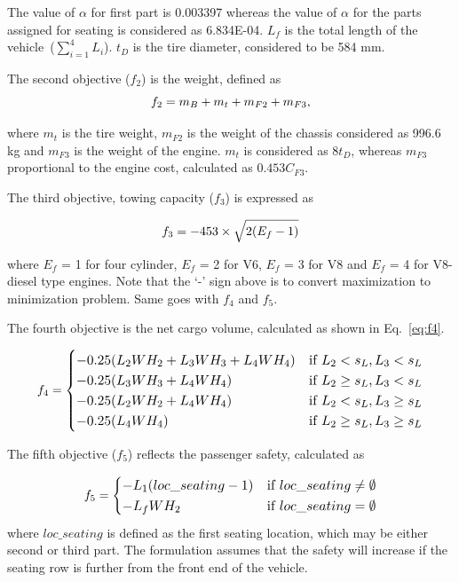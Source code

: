\documentclass[twocolumn,10pt]{asme2ej}
\begin{document}
The value of $\alpha$ for first part is 0.003397 whereas the value of $\alpha$ for the parts assigned for seating is considered as 6.834E-04. $L_f$ is the total length of the vehicle~($\sum_{i = 1}^4 L_i$). $t_D$ is the tire diameter, considered to be 584 mm. 

The second objective ($f_2$) is the weight, defined as
\begin{equation}\footnotesize
f_2 = m_B + m_t + m_{F2} + m_{F3},
\label{eq:f2}
\end{equation}

\noindent where $m_t$ is the tire weight, $m_{F2}$ is the weight of the chassis considered as 996.6 kg and $m_{F3}$ is the weight of the engine. $m_t$ is considered as $8 t_D$, whereas $m_{F3}$ proportional to the engine cost, calculated as $0.453C_{F3}$.

The third objective, towing capacity ($f_3$) is expressed as

\begin{equation}\footnotesize
f_3 = -453 \times \sqrt{2(E_f-1)} 
\label{eq:f3}
\end{equation}

\noindent where $E_f$ = 1 for four cylinder, $E_f$ = 2 for V6, $E_f$ = 3 for V8 and $E_f$ = 4 for V8-diesel type engines. Note that the `-' sign above is to convert maximization to minimization problem. Same goes with $f_4$ and $f_5$. 

The fourth objective is the net cargo volume, calculated as shown in Eq.~\ref{eq:f4}. 

\begin{equation}\footnotesize
f_4=\begin{cases}
-0.25(L_2WH_2 + L_3WH_3 + L_4WH_4) & \text{if}~L_2 < s_L, L_3 < s_L\\
-0.25(L_3WH_3 + L_4WH_4) & \text{if}~L_2 \ge s_L, L_3 < s_L\\
-0.25(L_2WH_2 + L_4WH_4) & \text{if}~L_2 < s_L, L_3 \ge s_L\\
-0.25(L_4WH_4) & \text{if}~L_2 \ge s_L, L_3 \ge s_L\\
\end{cases}
\label{eq:f4}
\end{equation}

The fifth objective ($f_5$) reflects the passenger safety, calculated as

\begin{equation}\footnotesize
f_5=\begin{cases}
-L_1(loc\_seating - 1) & \text{if}~loc\_seating \neq \emptyset\\
-L_fWH_2 & \text{if}~loc\_seating = \emptyset\\
\end{cases}
\label{eq:f5}
\end{equation}
where $loc\_seating$ is defined as the first seating location, which may be either second or third part. The formulation assumes that the safety will increase if the seating row is further from the front end of the vehicle. 
\end{document}
